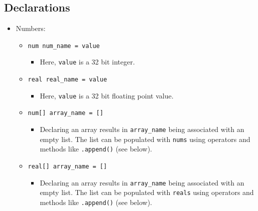 \documentclass[a4paper, 11pt]{article}
\begin{document}
    \subsection{Declarations}
      \begin{itemize}
        
        \item Numbers:
            \begin{itemize}
              \item \texttt{num num\_name = value} 
              \begin{itemize}
                \item Here, \texttt{value} is a 32 bit integer. 
              \end{itemize}
              \item \texttt{real real\_name = value} 
              \begin{itemize}
                \item Here, \texttt{value} is a 32 bit floating point value.
              \end{itemize}
              \item \texttt{num[] array\_name = []} 
              \begin{itemize}
                \item Declaring an array results in \texttt{array\_name} being associated with an empty list. The list can be populated with \texttt{nums} using operators and methods like \texttt{.append()} (see below).
              \end{itemize}
              \item \texttt{real[] array\_name = []} 
              \begin{itemize}
                \item Declaring an array results in \texttt{array\_name} being associated with an empty list. The list can be populated with \texttt{reals} using operators and methods like \texttt{.append()} (see below).
              \end{itemize}
            \end{itemize}



\end{itemize}
\end{document}
